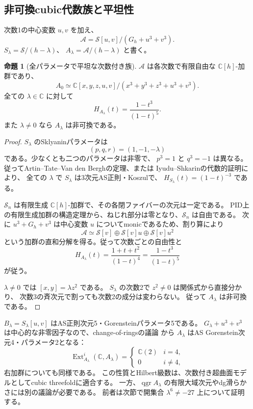 \documentclass[a4paper,11pt]{ltjsarticle}
\newcommand{\mathscr}{\mathcal}
\theoremstyle{definition}
\newtheorem{theorem}{命題}[section]
\newcommand{\CC}{\mathbb C}
\newcommand{\Ext}{\operatorname{Ext}}
\newcommand{\qgr}{\operatorname{qgr}}
\begin{document}
\subsection{非可換cubic代数族と平坦性}

次数1の中心変数 $u,v$ を加え、
\begin{equation}\label{eq:family}
 \boxed{\quad
 \mathscr A=\mathscr S[u,v]/(G_h+u^3+v^3).
 \quad}
\end{equation}
$S_\lambda=\mathscr S/(h-\lambda)$、
$A_\lambda=\mathscr A/(h-\lambda)$ と書く。

\begin{theorem}[全パラメータで平坦な次数付き族]\label{thm:family}
$\mathscr A$ は各次数で有限自由な $\CC[h]$-加群であり、
\[
 A_0\simeq
 \CC[x,y,z,u,v]/(x^3+y^3+z^3+u^3+v^3).
\]
全ての $\lambda\in\CC$ に対して
\[
 H_{A_\lambda}(t)=\frac{1-t^3}{(1-t)^5}.
\]
また $\lambda\ne0$ なら $A_\lambda$ は非可換である。
\end{theorem}

\begin{proof}
$S_\lambda$ のSklyaninパラメータは
\[
 (p,q,r)=(1,-1,-\lambda)
\]
である。少なくとも二つのパラメータは非零で、
$p^3=1$ と $q^3=-1$ は異なる。
従ってArtin--Tate--Van den Berghの定理、または
Iyudu--Shkarinの代数的証明\cite{IS}により、
全ての $\lambda$ で $S_\lambda$ は3次元AS正則・Koszulで、
$H_{S_\lambda}(t)=(1-t)^{-3}$ である。

$\mathscr S_n$ は有限生成 $\CC[h]$-加群で、その各閉ファイバーの次元は一定である。
PID上の有限生成加群の構造定理から、ねじれ部分は零となり、$\mathscr S_n$ は自由である。
次に $u^3+G_h+v^3$ は中心変数 $u$ についてmonicであるため、割り算により
\[
 \mathscr A\simeq
 \mathscr S[v]\oplus\mathscr S[v]u\oplus\mathscr S[v]u^2
\]
という加群の直和分解を得る。従って次数ごとの自由性と
\[
 H_{A_\lambda}(t)
 =\frac{1+t+t^2}{(1-t)^4}
 =\frac{1-t^3}{(1-t)^5}
\]
が従う。

$\lambda\ne0$ では $[x,y]=\lambda z^2$ である。
$S_\lambda$ の次数2で $z^2\ne0$ は関係式から直接分かり、
次数3の斉次元で割っても次数2の成分は変わらない。
従って $A_\lambda$ は非可換である。
\end{proof}

$B_\lambda=S_\lambda[u,v]$ はAS正則次元5・Gorensteinパラメータ5である。
$G_\lambda+u^3+v^3$ は中心的な非零因子なので、change-of-ringsの議論
\cite[Lemma 1.2]{HeYe}から
$A_\lambda$ はAS Gorenstein次元4・パラメータ2となる：
\[
 \Ext^i_{A_\lambda}(\CC,A_\lambda)=
 \begin{cases}
 \CC(2)&i=4,\\
 0&i\ne4,
 \end{cases}
\]
右加群についても同様である。
この性質とHilbert級数は、次数付き超曲面モデルとしてcubic threefoldに適合する。
一方、$\qgr A_\lambda$ の有限大域次元やdg滑らかさには別の議論が必要である。
前者は次節で開集合 $\lambda^6\ne-27$ 上について証明する。
\end{document}
